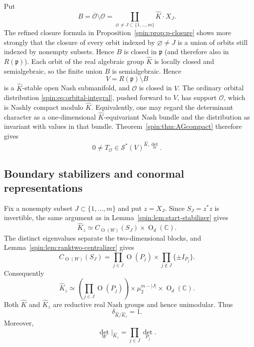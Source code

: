\documentclass[11pt,reqno]{amsart}
\numberwithin{equation}{section}
\theoremstyle{definition}
\theoremstyle{remark}
\newcommand{\C}{\mathbb C}
\newcommand{\Or}{\operatorname{O}}
\newcommand{\fp}{\mathfrak p}
\newcommand{\cO}{\mathcal O}
\newcommand{\cS}{\mathcal S}
\begin{document}
Put
\begin{equation}\label{spin:eq:Bboundary}
  B=\overline{\cO}\setminus\cO
   =\coprod_{\varnothing\ne J\subset\{1,\ldots,m\}}
     \widehat K\cdot X_J.
\end{equation}
The refined closure formula in Proposition~\ref{spin:prop:p-closure} shows
more strongly that the closure of every orbit indexed by
$\varnothing\ne J$ is a union of orbits still indexed by nonempty subsets.
Hence $B$ is closed in $\fp$ (and therefore also in $R(\fp)$).  Each orbit of the real algebraic group
$\widehat K$ is locally closed and semialgebraic, so the finite union $B$ is
semialgebraic.  Hence
\begin{equation}\label{spin:eq:Vopen}
  V=R(\fp)\setminus B
\end{equation}
is a $\widehat K$-stable open Nash submanifold, and $\cO$ is closed in $V$.
The ordinary orbital distribution \eqref{spin:eq:orbital-integral}, pushed forward
to $V$, has support $\cO$, which is Nashly compact modulo $\widehat K$.
Equivalently, one may regard the determinant character as a one-dimensional
$\widehat K$-equivariant Nash bundle and the distribution as invariant with
values in that bundle.  Theorem~\ref{spin:thm:AGcompact} therefore gives
\begin{equation}\label{spin:eq:TO-Schwartz}
  0\ne T_{\cO}\in\cS^*(V)^{\widehat K,\det_W}.
\end{equation}

\subsection{Boundary stabilizers and conormal representations}\label{spin:sec:conormal}

Fix a nonempty subset $J\subset\{1,\ldots,m\}$ and put $z=X_J$.  Since
$S_J=z^*z$ is invertible, the same argument as in
Lemma~\ref{spin:lem:start-stabilizer} gives
\begin{equation}\label{spin:eq:boundary-stabilizer}
  \widehat K_z
  \simeq
  C_{\Or(W)}(S_J)\times\Or_d(\C).
\end{equation}
The distinct eigenvalues separate the two-dimensional blocks, and
Lemma~\ref{spin:lem:ranktwo-centralizer} gives
\begin{equation}\label{spin:eq:boundary-centralizer}
  C_{\Or(W)}(S_J)
  =
  \prod_{j\in J}\Or(P_j)
  \times
  \prod_{j\notin J}\{\pm I_{P_j}\}.
\end{equation}
Consequently
\begin{equation}\label{spin:eq:boundary-stabilizer2}
  \widehat K_z
  \simeq
  \left(\prod_{j\in J}\Or(P_j)\right)
  \times\mu_2^{m-|J|}
  \times\Or_d(\C).
\end{equation}
Both $\widehat K$ and $\widehat K_z$ are reductive real Nash groups and hence
unimodular.  Thus
\begin{equation}\label{spin:eq:modular-trivial}
  \delta_{\widehat K/\widehat K_z}=1.
\end{equation}
Moreover,
\begin{equation}\label{spin:eq:detW-boundary}
  \det_W|_{\widehat K_z}
  =\prod_{j\in J}\det_{P_j}.
\end{equation}
\end{document}
